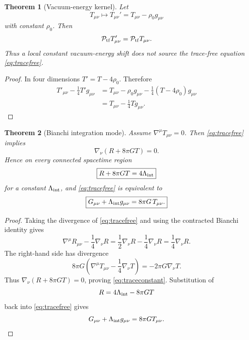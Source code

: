 \documentclass[aps,prd,reprint,nofootinbib,superscriptaddress]{revtex4-2}
\numberwithin{equation}{section}
\theoremstyle{definition}
\theoremstyle{plain}
\newtheorem{theorem}{Theorem}[section]
\newcommand{\Ptr}{\mathcal P_{\rm tf}}
\begin{document}
\begin{theorem}[Vacuum-energy kernel]\label{thm:vacuum-kernel}
Let
\begin{equation}
T_{\mu\nu}\longmapsto T_{\mu\nu}'=T_{\mu\nu}-\rho_0g_{\mu\nu}
\end{equation}
with constant \(\rho_0\).  Then
\begin{equation}
\Ptr T'_{\mu\nu}=\Ptr T_{\mu\nu}.
\end{equation}
Thus a local constant vacuum-energy shift does not source the trace-free equation \eqref{eq:tracefree}.
\end{theorem}

\begin{proof}
In four dimensions \(T'=T-4\rho_0\).  Therefore
\begin{align}
T'_{\mu\nu}-\frac14T'g_{\mu\nu}
&=
T_{\mu\nu}-\rho_0g_{\mu\nu}
-\frac14(T-4\rho_0)g_{\mu\nu}\\
&=
T_{\mu\nu}-\frac14Tg_{\mu\nu}.
\end{align}
\end{proof}

\begin{theorem}[Bianchi integration mode]\label{thm:bianchi-integration}
Assume \(\nabla^\mu T_{\mu\nu}=0\).  Then \eqref{eq:tracefree} implies
\begin{equation}
\nabla_\nu(R+8\pi G T)=0.
\end{equation}
Hence on every connected spacetime region
\begin{equation}
\boxed{
R+8\pi G T=4\Lambda_{\rm int}
}
\label{eq:traceconstant}
\end{equation}
for a constant \(\Lambda_{\rm int}\), and \eqref{eq:tracefree} is equivalent to
\begin{equation}
\boxed{
G_{\mu\nu}+\Lambda_{\rm int}g_{\mu\nu}
=
8\pi G\,T_{\mu\nu}.
}
\label{eq:einstein-int}
\end{equation}
\end{theorem}

\begin{proof}
Taking the divergence of \eqref{eq:tracefree} and using the contracted Bianchi identity gives
\[
\nabla^\mu R_{\mu\nu}-\frac14\nabla_\nu R
=
\frac12\nabla_\nu R-\frac14\nabla_\nu R
=
\frac14\nabla_\nu R.
\]
The right-hand side has divergence
\[
8\pi G\left(\nabla^\mu T_{\mu\nu}-\frac14\nabla_\nu T\right)
=
-2\pi G\nabla_\nu T.
\]
Thus \(\nabla_\nu(R+8\pi GT)=0\), proving \eqref{eq:traceconstant}.  Substitution of
\[
R=4\Lambda_{\rm int}-8\pi GT
\]
back into \eqref{eq:tracefree} gives
\[
G_{\mu\nu}+\Lambda_{\rm int}g_{\mu\nu}=8\pi GT_{\mu\nu}.
\]
\end{proof}
\end{document}
